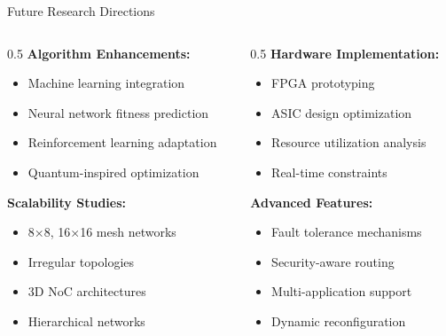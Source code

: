 \documentclass[10pt]{beamer}
\begin{document}
\begin{frame}{Future Research Directions}
    \begin{columns}
        \begin{column}{0.5\textwidth}
            \textbf{Algorithm Enhancements:}
            \begin{itemize}
                \item Machine learning integration
                \item Neural network fitness prediction
                \item Reinforcement learning adaptation
                \item Quantum-inspired optimization
            \end{itemize}
            
            \textbf{Scalability Studies:}
            \begin{itemize}
                \item 8×8, 16×16 mesh networks
                \item Irregular topologies
                \item 3D NoC architectures
                \item Hierarchical networks
            \end{itemize}
        \end{column}
        \begin{column}{0.5\textwidth}
            \textbf{Hardware Implementation:}
            \begin{itemize}
                \item FPGA prototyping
                \item ASIC design optimization
                \item Resource utilization analysis
                \item Real-time constraints
            \end{itemize}
            
            \textbf{Advanced Features:}
            \begin{itemize}
                \item Fault tolerance mechanisms
                \item Security-aware routing
                \item Multi-application support
                \item Dynamic reconfiguration
            \end{itemize}
        \end{column}
    \end{columns}
    

\end{frame}
\end{document}
